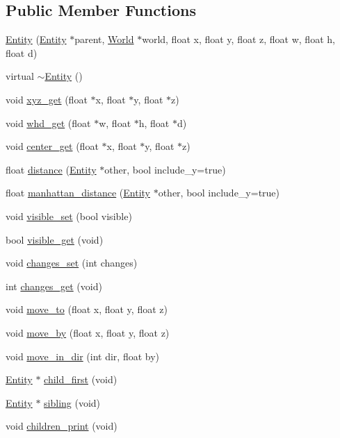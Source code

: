 \subsection*{Public Member Functions}
\begin{DoxyCompactItemize}
\item 
\mbox{\hyperlink{classEntity_a75afa73e0478e96c6ae96ab4428295a0}{Entity}} (\mbox{\hyperlink{classEntity}{Entity}} $\ast$parent, \mbox{\hyperlink{classWorld}{World}} $\ast$world, float x, float y, float z, float w, float h, float d)
\item 
virtual \mbox{\hyperlink{classEntity_a588098978eea6a3486b7361605ff3f0f}{$\sim$\+Entity}} ()
\item 
void \mbox{\hyperlink{classEntity_a9e99a54fce35facb3410b683e41d80e1}{xyz\+\_\+get}} (float $\ast$x, float $\ast$y, float $\ast$z)
\item 
void \mbox{\hyperlink{classEntity_a7172fa9327ac448a2d80bce33a2be256}{whd\+\_\+get}} (float $\ast$w, float $\ast$h, float $\ast$d)
\item 
void \mbox{\hyperlink{classEntity_af8102d176a86501d1e76adac59c280f5}{center\+\_\+get}} (float $\ast$x, float $\ast$y, float $\ast$z)
\item 
float \mbox{\hyperlink{classEntity_a7c5459bec53c3a9a3c5207964f1eab99}{distance}} (\mbox{\hyperlink{classEntity}{Entity}} $\ast$other, bool include\+\_\+y=true)
\item 
float \mbox{\hyperlink{classEntity_a5cd6b84c61bca6e206895d1bc7c8ad63}{manhattan\+\_\+distance}} (\mbox{\hyperlink{classEntity}{Entity}} $\ast$other, bool include\+\_\+y=true)
\item 
void \mbox{\hyperlink{classEntity_a4ef03d07f6077a104589568aafb068ee}{visible\+\_\+set}} (bool visible)
\item 
bool \mbox{\hyperlink{classEntity_aab8f9cda6abb84ee7f9528d2e74554eb}{visible\+\_\+get}} (void)
\item 
void \mbox{\hyperlink{classEntity_aab220a9397ea676632ad622e5b2f214c}{changes\+\_\+set}} (int changes)
\item 
int \mbox{\hyperlink{classEntity_a8414f493594b6a5746e2a959c17a2989}{changes\+\_\+get}} (void)
\item 
void \mbox{\hyperlink{classEntity_ad5ac30e3a84dc75899558268dfe302ac}{move\+\_\+to}} (float x, float y, float z)
\item 
void \mbox{\hyperlink{classEntity_ac5c2ecde136877863c4fc512d2081b7a}{move\+\_\+by}} (float x, float y, float z)
\item 
void \mbox{\hyperlink{classEntity_ad14803ac2db89cbd788302f1fc385b0e}{move\+\_\+in\+\_\+dir}} (int dir, float by)
\item 
\mbox{\hyperlink{classEntity}{Entity}} $\ast$ \mbox{\hyperlink{classEntity_a20373262203fef220323dc3f89d3a472}{child\+\_\+first}} (void)
\item 
\mbox{\hyperlink{classEntity}{Entity}} $\ast$ \mbox{\hyperlink{classEntity_adc18417a592fccbac61f000eb9ec88fe}{sibling}} (void)
\item 
void \mbox{\hyperlink{classEntity_ae38443719b4d82441a987fcda0d293c3}{children\+\_\+print}} (void)
\end{DoxyCompactItemize}
